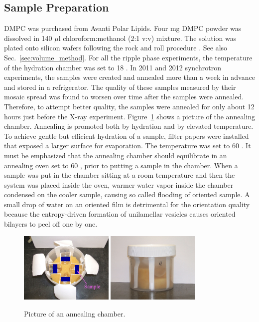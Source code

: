 \subsection{Sample Preparation}\label{sec:ripple_sample_prep}
DMPC was purchased from Avanti Polar Lipids.
Four mg DMPC powder was dissolved in 140 $\mu$l chloroform:methanol (2:1 v:v) 
mixture. The solution was plated onto silicon wafers following the rock and
roll procedure \cite{Tristram-Nagle07_MMB}. 
See also Sec.~\ref{sec:volume_method}.
For all the ripple phase experiments, the temperature of the hydration 
chamber was set to 18 \textcelsius. 
In 2011 and 2012 synchrotron experiments, the samples were created and annealed 
more than a week in advance and stored in a refrigerator. The quality of 
these samples measured by their mosaic spread was found to worsen over time
after the samples were annealed. Therefore, to attempt better quality, the 
samples were annealed for only about 12 hours just before the X-ray experiment.
Figure~\ref{fig:annealing_chamber} shows a picture of the annealing chamber.
Annealing is promoted both by hydration and by elevated temperature. 
To achieve gentle but efficient hydration of a sample, filter papers were installed
that exposed a larger surface for evaporation. The temperature was set to
60 \textcelsius.
It must be emphasized that the annealing 
chamber should equilibrate in an annealing oven set to 60 \textcelsius,
prior to putting a sample in the chamber.
When a sample was put in the chamber sitting at a room temperature and
then the system was placed inside the oven, warmer water vapor inside the chamber 
condensed on the cooler sample, causing so called flooding of oriented sample. 
A small drop of water on an oriented film is detrimental for the orientation quality because the
entropy-driven formation of unilamellar vesicles causes oriented bilayers to peel off
one by one. 

\begin{figure}[htbp]
  \centering
  \includegraphics[width=0.4\textwidth]{figures/ripple/MMs/annealing_chamber_topview}
  \quad
  \includegraphics[width=0.4\textwidth]{figures/ripple/MMs/annealing_chamber_sideview}  
  \caption[Pictures of an annealing chamber]{Picture of an annealing chamber.}
  \label{fig:annealing_chamber}
\end{figure}

